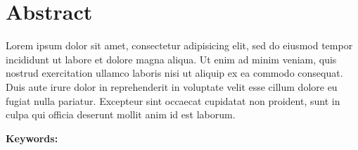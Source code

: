 
%
%


\chapter*{Abstract}

Lorem ipsum dolor sit amet, consectetur adipisicing elit, sed do eiusmod tempor incididunt ut labore et dolore magna aliqua. Ut enim ad minim veniam, quis nostrud exercitation ullamco laboris nisi ut aliquip ex ea commodo consequat. Duis aute irure dolor in reprehenderit in voluptate velit esse cillum dolore eu fugiat nulla pariatur. Excepteur sint occaecat cupidatat non proident, sunt in culpa qui officia deserunt mollit anim id est laborum.

\vskip0.5cm
\noindent\textbf{Keywords:}
\Keywords
